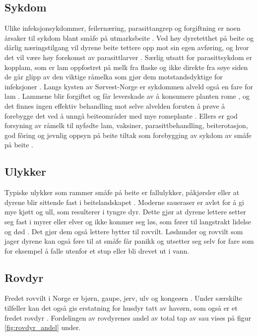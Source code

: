 \subsection{Sykdom}
Ulike infeksjonsykdommer, feilernæring, parasittangrep og forgiftning er noen årsaker til sykdom blant småfe på utmarksbeite \cite{Johanssen2018AtferdSau}. Ved høy dyretetthet på beite og dårlig næringstilgang vil dyrene beite tettere opp mot sin egen avføring, og hvor det vil være høy forekomst av parasittlarver \cite{Tjrhom2019ForebyggingBeitebruk}. Særlig utsatt for parasittsykdom er kopplam, som er lam oppfostret på melk fra flaske og ikke direkte fra søye \cite{Tjrhom2019ForebyggingBeitebruk} siden de går glipp av den viktige råmelka som gjør dem motstandsdyktige for infeksjoner \cite[s.44]{engenForingAvKopplam2017}. Langs kysten av Sørvest-Norge er sykdommen alveld også en fare for lam \cite{Velle2018Alveld}. Lammene blir forgiftet og får leverskade av å konsumere planten rome \cite{Velle2018Alveld}, og det finnes ingen effektiv behandling mot selve alvelden foruten å prøve å forebygge det ved å unngå beiteområder med mye romeplante \cite{Sauehelsenett2017Alveld}. Ellers er god forsyning av råmelk til nyfødte lam, vaksiner, parasittbehandling, beiterotasjon, god fôring og jevnlig oppsyn på beite tiltak som forebygging av sykdom av småfe på beite \cite{Tjrhom2019ForebyggingBeitebruk, Johanssen2018AtferdSau}. 

\subsection{Ulykker}
Typiske ulykker som rammer småfe på beite er fallulykker, påkjørsler eller at dyrene blir sittende fast i beitelandskapet \cite{Dyrevernalliansen2019SauHusdyr}. Moderne saueraser er avlet for å gi mye kjøtt og ull, som resulterer i tyngre dyr. Dette gjør at dyrene lettere setter seg fast i myrer eller elver og ikke kommer seg løs, som fører til langstrakt lidelse og død \cite{Dyrevernalliansen2019SauHusdyr}. Det gjør dem også lettere bytter til rovvilt. Løshunder og rovvilt som jager dyrene kan også føre til at småfe får panikk og utsetter seg selv for fare som for eksempel å falle utenfor et stup eller bli drevet ut i vann.  

\subsection{Rovdyr} \label{sub:rovdyr}
Fredet rovvilt i Norge er bjørn, gaupe, jerv, ulv og kongeørn \cite{MiljdirektoratetRovbase}. Under særskilte tilfeller kan det også gis erstatning for husdyr tatt av havørn, som også er et fredet rovdyr \cite{2014ForskriftRovvilt}. Fordelingen av rovdyrenes andel av total tap av sau vises på figur \ref{fig:rovdyr_andel} under.

